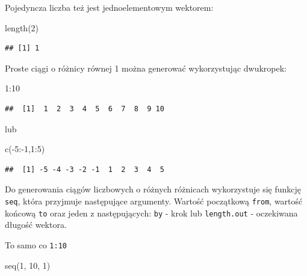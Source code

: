 \documentclass[
]{book}
\newenvironment{Shaded}{\begin{snugshade}}{\end{snugshade}}
\newcommand{\DecValTok}[1]{\textcolor[rgb]{0.00,0.00,0.81}{#1}}
\newcommand{\FunctionTok}[1]{\textcolor[rgb]{0.00,0.00,0.00}{#1}}
\newcommand{\NormalTok}[1]{#1}
\newcommand{\SpecialCharTok}[1]{\textcolor[rgb]{0.00,0.00,0.00}{#1}}
\begin{document}
Pojedyncza liczba też jest jednoelementowym wektorem:

\begin{Shaded}
\begin{Highlighting}[]
\FunctionTok{length}\NormalTok{(}\DecValTok{2}\NormalTok{)}
\end{Highlighting}
\end{Shaded}

\begin{verbatim}
## [1] 1
\end{verbatim}

Proste ciągi o różnicy równej 1 można generować wykorzystując dwukropek:

\begin{Shaded}
\begin{Highlighting}[]
\DecValTok{1}\SpecialCharTok{:}\DecValTok{10}
\end{Highlighting}
\end{Shaded}

\begin{verbatim}
##  [1]  1  2  3  4  5  6  7  8  9 10
\end{verbatim}

lub

\begin{Shaded}
\begin{Highlighting}[]
\FunctionTok{c}\NormalTok{(}\SpecialCharTok{{-}}\DecValTok{5}\SpecialCharTok{:{-}}\DecValTok{1}\NormalTok{,}\DecValTok{1}\SpecialCharTok{:}\DecValTok{5}\NormalTok{)}
\end{Highlighting}
\end{Shaded}

\begin{verbatim}
##  [1] -5 -4 -3 -2 -1  1  2  3  4  5
\end{verbatim}

Do generowania ciągów liczbowych o różnych różnicach wykorzystuje się funkcję \texttt{seq}, która przyjmuje następujące argumenty. Wartość początkową \texttt{from}, wartość końcową \texttt{to} oraz jeden z następujących: \texttt{by} - krok lub \texttt{length.out} - oczekiwana długość wektora.

To samo co \texttt{1:10}

\begin{Shaded}
\begin{Highlighting}[]
\FunctionTok{seq}\NormalTok{(}\DecValTok{1}\NormalTok{, }\DecValTok{10}\NormalTok{, }\DecValTok{1}\NormalTok{)}
\end{Highlighting}
\end{Shaded}
\end{document}
